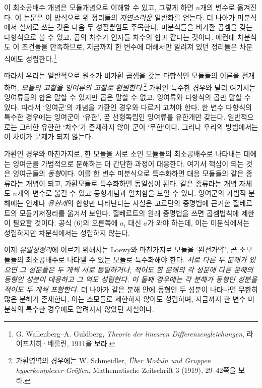 이 최소공배수 개념은 모듈개념으로 이해할 수 있고, 그렇게 하면 \(n\)개의 변수로 옮겨진다. 이 논문은 이 방식으로 위 정리들의 \emph{자연스러운} 일반화를 얻는다. 더 나아가 미분식에서 실제로 쓰는 것은 다음 두 성질뿐임도 주목한다. 미분식들을 비가환 곱셈을 갖는 다항식으로 볼 수 있고, 곱의 차수가 인자들 차수의 합과 같다는 것이다. 예컨대 차분식도 이 조건들을 만족하므로, 지금까지 한 변수에 대해서만 알려져 있던 정리들은 차분식에도 성립한다.\footnote{G. Wallenberg--A. Guldberg, \emph{Theorie der linearen Differenzengleichungen}, 라이프치히·베를린, 1911을 보라.}

따라서 우리는 일반적으로 원소가 비가환 곱셈을 갖는 다항식인 모듈들의 이론을 전개하며, \emph{모듈의 고찰을 잉여류의 고찰로 환원한다}.\footnote{가환영역의 경우에는 W. Schmeidler, \emph{Über Moduln und Gruppen hyperkomplexer Größen}, Mathematische Zeitschrift 3 (1919), 29--42쪽을 보라.} 가환인 특수한 경우와 달리 여기서는 잉여류들의 합은 말할 수 있지만 곱은 말할 수 없고, 잉여류와 다항식의 곱만 말할 수 있다. 따라서 ‘잉여군’의 개념을 가환인 경우와 다르게 고쳐야 한다. 한 변수 다항식의 특수한 경우에는 잉여군이 ‘유한’, 곧 선형독립인 잉여류를 유한개만 갖는다. 일반적으로는 그러한 유한한 ‘차수’가 존재하지 않아 군이 ‘무한’이다. 그러나 우리의 방법에서는 이 차이가 문제가 되지 않는다.

가환인 경우와 마찬가지로, 한 모듈을 서로 소인 모듈들의 최소공배수로 나타내는 데에는 잉여군을 가법적으로 분해하는 더 간단한 과정이 대응한다. 여기서 핵심이 되는 것은 잉여군들의 \emph{동형}이다. 이를 한 변수 미분식으로 특수화하면 대응 모듈들의 같은 종류라는 개념이 되고, 가환모듈로 특수화하면 동일성이 된다. 같은 종류라는 개념 자체도 \(n\)개의 변수로 옮길 수 있고 동형개념과 일치함을 보일 수 있다. 잉여군의 가법적 분해에는 언제나 \emph{유한개}의 합항만 나타난다는 사실은 고르단의 증명법에 근거한 힐베르트의 모듈기저정리를 옮겨서 보인다. 힐베르트의 원래 증명법을 쓰면 곱셈법칙에 제한이 필요할 것이다. 공식 (6)의 오른쪽에 \(a_i\) 대신 \(a\)가 와야 하는데, 이는 미분식에서는 성립하지만 차분식에서는 성립하지 않는다.

이제 \emph{유일성정리}에 이르기 위해서는 Loewy와 마찬가지로 모듈을 ‘완전가약’, 곧 소모듈들의 최소공배수로 나타낼 수 있는 모듈로 특수화해야 한다. \emph{서로 다른 두 분해가 있으면 그 성분들은 두 개씩 서로 동일하거나, 적어도 한 분해의 각 성분에 다른 분해의 동형인 성분이 대응하고 그 역도 성립한다. 이 둘째 경우에는 각 분해가 동형인 성분을 적어도 두 개씩 포함한다.} 더 나아가 같은 분해 안에 동형인 두 성분이 나타나면 무한히 많은 분해가 존재한다. 이는 소모듈로 제한하지 않아도 성립하며, 지금까지 한 변수 미분식의 특수한 경우에도 알려지지 않았던 사실이다.


